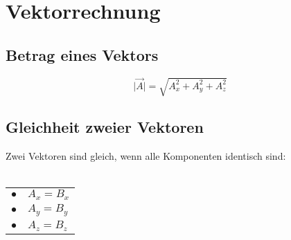\section{Vektorrechnung}
		
	\subsection{Betrag eines Vektors}
	$$ \vert \vec{A} \vert =  \sqrt{A_x^2 + A_y^2 + A_z^2}$$
		
		
	\subsection{Gleichheit zweier Vektoren}
	Zwei Vektoren sind gleich, wenn alle Komponenten identisch sind: \\
	\\
	\begin{tabular}{ll}
	$\bullet$ & $A_x = B_x$\\
	$\bullet$ & $A_y = B_y$\\
	$\bullet$ & $A_z = B_z$\\
	\end{tabular}		
		

		
		
